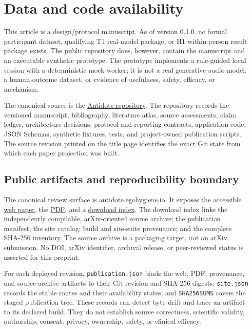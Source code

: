 \section{Data and code availability}
\label{sec:data-and-code-availability}

This article is a design/protocol manuscript. As of version 0.1.0, no formal
participant dataset, qualifying T1 real-model
package, or H1 within-person result package exists. The public repository does,
however, contain the manuscript and an executable synthetic prototype. The
prototype implements a rule-guided local session with a deterministic mock
worker; it is not a real generative-audio model, a human-outcome dataset, or
evidence of usefulness, safety, efficacy, or mechanism.

The canonical source is the
\href{https://github.com/egohygiene/antidote}{Antidote repository}. The
repository records the versioned manuscript, bibliography, literature atlas,
source assessments, claim ledger, architecture decisions, protocol and
reporting contracts, application code, JSON Schemas, synthetic fixtures,
tests, and project-owned publication scripts. The source revision printed on
the title page identifies the exact Git state from which each paper projection
was built.

\subsection{Public artifacts and reproducibility boundary}
\label{sec:availability-public-artifacts}

The canonical review surface is
\href{https://antidote.egohygiene.io/}{antidote.egohygiene.io}. It exposes the
\href{https://antidote.egohygiene.io/paper/}{accessible web paper}, the
\href{https://antidote.egohygiene.io/antidote.pdf}{PDF}, and a
\href{https://antidote.egohygiene.io/downloads/}{download index}. The download
index links the independently compilable, arXiv-oriented source archive; the
publication manifest; the site catalog; build and site-suite provenance; and
the complete SHA-256 inventory. The source archive is a packaging target, not
an arXiv submission. No DOI, arXiv identifier, archival release, or
peer-reviewed status is asserted for this preprint.

For each deployed revision, \texttt{publication.json} binds the web, PDF,
provenance, and source-archive artifacts to their Git revision and SHA-256
digests; \texttt{site.json} records the stable routes and their availability
states; and \texttt{SHA256SUMS} covers the staged publication tree. These
records can detect byte drift and trace an artifact to its declared build.
They do not establish source correctness, scientific validity, authorship,
consent, privacy, ownership, safety, or clinical efficacy.

